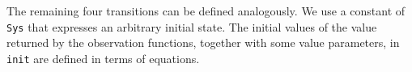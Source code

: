 \documentclass[a4paper,fleqn]{cas-dc}
\begin{document}
\noindent
The remaining four transitions
can be defined analogously.
We use a constant of \verb!Sys! that expresses an arbitrary initial state. The initial values of the value returned by the observation functions, together with some value parameters, in \verb!init! are defined in terms of equations.
\end{document}
